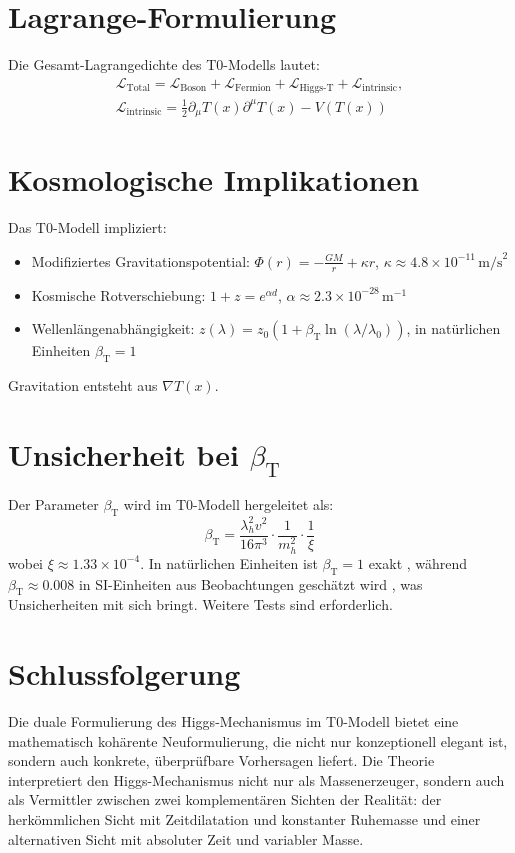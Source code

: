 \documentclass[a4paper,12pt]{article}
\newcommand{\Tfield}{T(x)}
\newcommand{\betaT}{\beta_{\text{T}}}
\begin{document}
	\section{Lagrange-Formulierung}
	Die Gesamt-Lagrangedichte des T0-Modells lautet:
	\begin{multline}
		\mathcal{L}_{\text{Total}} = \mathcal{L}_{\text{Boson}} + \mathcal{L}_{\text{Fermion}} + \mathcal{L}_{\text{Higgs-T}} + \mathcal{L}_{\text{intrinsic}}, \\
		\mathcal{L}_{\text{intrinsic}} = \frac{1}{2} \partial_\mu \Tfield \partial^\mu \Tfield - V(\Tfield)
	\end{multline}
	
	\section{Kosmologische Implikationen}
	Das T0-Modell impliziert:
	\begin{itemize}
		\item Modifiziertes Gravitationspotential: \( \Phi(r) = -\frac{GM}{r} + \kappa r \), \( \kappa \approx 4.8 \times 10^{-11} \, \text{m/s}^2 \)
		\item Kosmische Rotverschiebung: \( 1 + z = e^{\alpha d} \), \( \alpha \approx 2.3 \times 10^{-28} \, \text{m}^{-1} \)
		\item Wellenlängenabhängigkeit: \( z(\lambda) = z_0 (1 + \betaT \ln(\lambda/\lambda_0)) \), in natürlichen Einheiten \(\betaT = 1\)
	\end{itemize}
	Gravitation entsteht aus \( \nabla \Tfield \).
	
	\section{Unsicherheit bei \(\betaT\)}
	Der Parameter \(\betaT\) wird im T0-Modell hergeleitet als:
	\begin{equation}
		\betaT = \frac{\lambda_h^2 v^2}{16\pi^3} \cdot \frac{1}{m_h^2} \cdot \frac{1}{\xi}
	\end{equation}
	wobei \(\xi \approx 1.33 \times 10^{-4}\). In natürlichen Einheiten ist \(\betaT = 1\) exakt \cite{pascher_alphabeta_2025}, während \(\betaT \approx 0.008\) in SI-Einheiten aus Beobachtungen geschätzt wird \cite{pascher_massenvariation_2025}, was Unsicherheiten mit sich bringt. Weitere Tests sind erforderlich.
	
	\section{Schlussfolgerung}
	Die duale Formulierung des Higgs-Mechanismus im T0-Modell bietet eine mathematisch kohärente Neuformulierung, die nicht nur konzeptionell elegant ist, sondern auch konkrete, überprüfbare Vorhersagen liefert. Die Theorie interpretiert den Higgs-Mechanismus nicht nur als Massenerzeuger, sondern auch als Vermittler zwischen zwei komplementären Sichten der Realität: der herkömmlichen Sicht mit Zeitdilatation und konstanter Ruhemasse und einer alternativen Sicht mit absoluter Zeit und variabler Masse.
	
\end{document}
